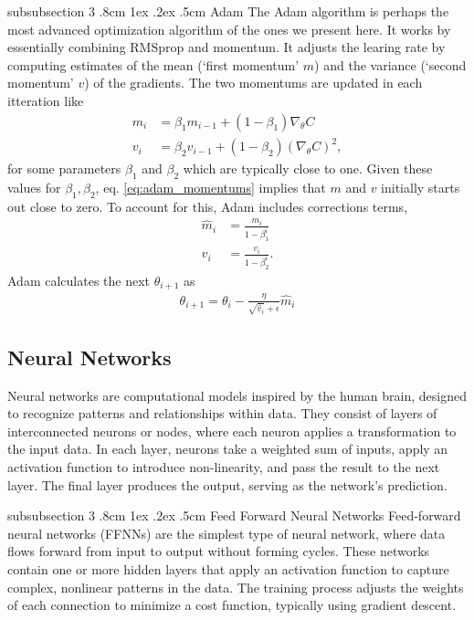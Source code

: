 \documentclass[%
reprint,s
amsmath,amssymb,
aps,
]{revtex4-2}
\makeatletter
\renewcommand{\subsubsection}{%
	\@startsection
	{subsubsection}%
	{3}%
	{\z@}%
	{.8cm \@plus1ex \@minus .2ex}%
	{.5cm}%
	{\normalfont\small\centering}%
}
\makeatother
\begin{document}
\subsubsection{Adam}
The Adam algorithm is perhaps the most advanced optimization algorithm of the ones we present here. It works by essentially combining RMSprop and momentum. It adjusts the learing rate by computing estimates of the mean (`first momentum' \(m\)) and the variance (`second momentum' \(v\)) of the gradients. The two momentums are updated in each itteration like
\begin{align}	\label{eq:adam_momentums}
	m_i &= \beta_1 m_{i-1} + (1 - \beta_1) \nabla_{\theta} C \\
    v_i &= \beta_2 v_{i-1} + (1 - \beta_2) (\nabla_{\theta} C)^2,
\end{align}
for some parameters \(\beta_1\) and \(\beta_2\) which are typically close to one. Given these values for \(\beta_1, \beta_2\), eq. \eqref{eq:adam_momentums} implies that \(m\) and \(v\) initially starts out close to zero. To account for this, Adam includes corrections terms,
\begin{align}
	\hat{m}_i &= \frac{m_i}{1 - \beta_1^i} \\
    \hat{v}_i &= \frac{v_i}{1 - \beta_2^i}.
\end{align}
Adam calculates the next \(\theta_{i+1}\) as 
\begin{align}
	\theta_{i+1} = \theta_{i} - \frac{\eta}{\sqrt{\hat{v}_i} + \epsilon} \hat{m}_i
\end{align}



\subsection{Neural Networks}	\label{sec:neutral_networks}
Neural networks are computational models inspired by the human brain, designed to recognize patterns and relationships within data. They consist of layers of interconnected neurons or nodes, where each neuron applies a transformation to the input data. In each layer, neurons take a weighted sum of inputs, apply an activation function to introduce non-linearity, and pass the result to the next layer. The final layer produces the output, serving as the network’s prediction.

\subsubsection{Feed Forward Neural Networks}
Feed-forward neural networks (FFNNs) are the simplest type of neural network, where data flows forward from input to output without forming cycles. These networks contain one or more hidden layers that apply an activation function to capture complex, nonlinear patterns in the data. The training process adjusts the weights of each connection to minimize a cost function, typically using gradient descent.
\end{document}
